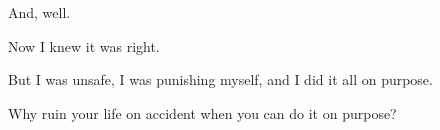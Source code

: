 \begin{paracol}{2}
\begin{leftcolumn}
And, well.

Now I knew it was right.

But I was unsafe, I was punishing myself, and I did it all on purpose.

\begin{ally}
Why ruin your life on accident when you can do it on purpose?
\end{ally}
\newpage

\end{leftcolumn}
\end{paracol}
\resetbackgroundcolor
